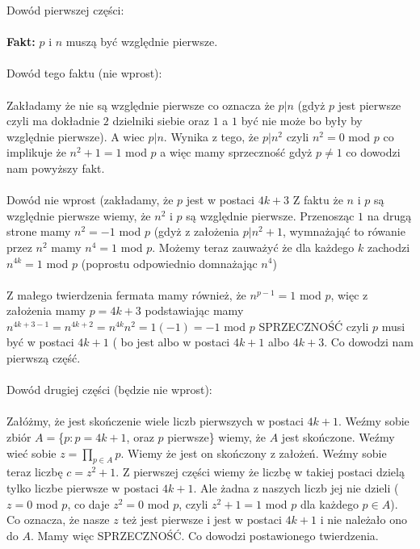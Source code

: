 Dowód pierwszej części: \\ \\
\textbf{Fakt:} $p$ i $n$ muszą być względnie pierwsze.
\\
\\ Dowód tego faktu (nie wprost):\\ \\
Zakładamy że nie są względnie pierwsze co oznacza że $p | n$ (gdyż $p$ jest pierwsze czyli ma dokładnie $2$ dzielniki siebie oraz $1$ a $1$ być nie może bo były by względnie pierwsze). A wiec $p | n$. Wynika z tego, że $p | n^{2}$ czyli $n^{2} = 0$ mod $p$ co implikuje że $n^{2} + 1 = 1$ mod $p$ a więc mamy sprzeczność gdyż $p \neq 1$ co dowodzi nam powyższy fakt.
\\
\\
Dowód nie wprost (zakładamy, że $p$ jest w postaci $4k + 3$
Z faktu że $n$ i $p$ są względnie pierwsze wiemy, że $n^{2}$ i $p$ są względnie pierwsze. Przenosząc $1$ na drugą strone mamy $n^{2} = -1$ mod $p$ (gdyż z założenia $p | n^{2} + 1$, wymnażająć to rówanie przez $n^{2}$ mamy $n^{4} = 1$ mod $p$. Możemy teraz zauważyć że dla każdego $k$ zachodzi $n^{4k} = 1$ mod $p$ (poprostu odpowiednio domnażając $n^{4}$)\\ \\
Z małego twierdzenia fermata mamy również, że $n^{p-1} = 1$ mod $p$, więc z założenia mamy $p = 4k+3$ podstawiając mamy $n^{4k+3-1} = n^{4k+2} = n^{4k}n^{2} = 1(-1) = -1$ mod $p$ SPRZECZNOŚĆ czyli $p$ musi być w postaci $4k + 1$ ( bo jest albo w postaci $4k + 1$ albo $4k + 3$. Co dowodzi nam pierwszą część.
\\
\\
Dowód drugiej części (będzie nie wprost):
\\
\\
Załóżmy, że jest skończenie wiele liczb pierwszych w postaci $4k + 1$. Weźmy sobie zbiór $A = $\{$ p: p = 4k +1$, oraz $p$ pierwsze\} wiemy, że $A$ jest skończone. Weźmy wieć sobie $z = \prod_{p \in A} p$. Wiemy że jest on skończony z założeń. Weźmy sobie teraz liczbę $c = z^{2} + 1$. Z pierwszej części wiemy że liczbę w takiej postaci dzielą tylko liczbe pierwsze w postaci $4k+1$.
Ale żadna z naszych liczb jej nie dzieli ($z = 0$ mod $p$, co daje $z^{2} = 0$ mod $p$, czyli $z^{2} + 1 = 1$ mod $p$ dla każdego $p \in A$). Co oznacza, że nasze $z$ też jest pierwsze i jest w postaci $4k + 1$ i nie należało ono do $A$. Mamy więc SPRZECZNOŚĆ. Co dowodzi postawionego twierdzenia.



